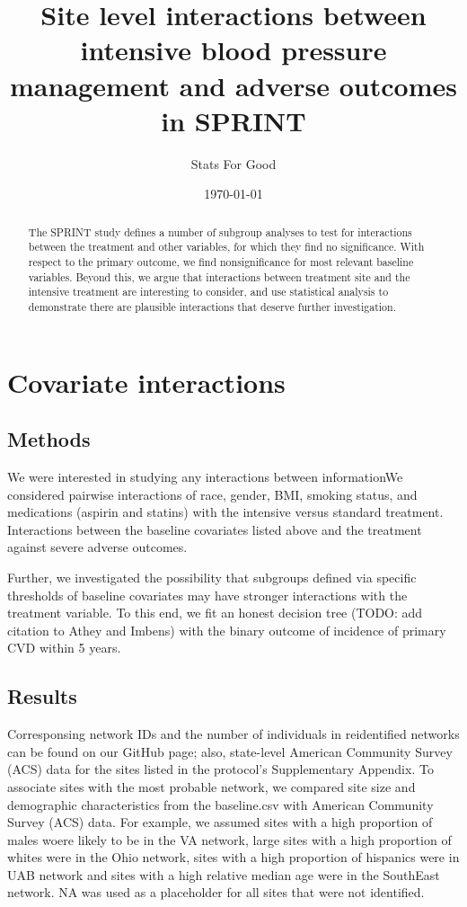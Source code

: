 \documentclass[10pt]{article}
\title{\vspace{-2em}Site level interactions between intensive blood pressure management and
  adverse outcomes in SPRINT}
\author{Stats For Good}
\date{\today}
\begin{document}
 \maketitle

\begin{abstract}
  The SPRINT study defines a number of subgroup analyses to test for
  interactions between the treatment and other variables, for which they find no
  significance. With respect to the primary outcome, we find nonsignificance
  for most relevant baseline variables. Beyond this, we argue that interactions
  between treatment site and the intensive treatment are interesting to
  consider, and use statistical analysis to demonstrate there are plausible
  interactions that deserve further investigation. 
\end{abstract}

\section{Covariate interactions}
\subsection{Methods}
We were interested in studying any interactions between informationWe considered pairwise interactions of race, gender, BMI, smoking status, and
medications (aspirin and statins) with the intensive versus standard
treatment. Interactions between the baseline covariates listed above and the treatment
against severe adverse outcomes.

Further, we investigated the possibility that subgroups defined via specific
thresholds of baseline covariates may have stronger interactions with the
treatment variable. To this end, we fit an honest decision tree (TODO: add
citation to Athey and Imbens) with the binary outcome of incidence of primary
CVD within 5 years.

\subsection{Results}
Corresponsing network IDs and the number of individuals in reidentified networks
can be found on our GitHub page; also, state-level American Community Survey (ACS)
data for the sites listed in the protocol's Supplementary Appendix. To associate
sites with the most probable network, we compared site size and demographic
characteristics from the baseline.csv with American Community Survey
(ACS) data.  For example, we assumed sites with a high proportion of males
woere likely to be in the VA network, large sites with a high proportion of whites
were in the Ohio network, sites with a high proportion of hispanics
were in UAB network and sites with a high relative median age were in the SouthEast
network.  NA was used as a placeholder for all sites that were not identified.
\end{document}
